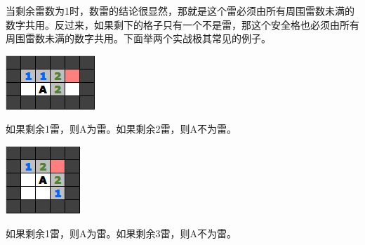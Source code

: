当剩余雷数为1时，数雷的结论很显然，那就是这个雷必须由所有周围雷数未满的数字共用。反过来，如果剩下的格子只有一个不是雷，那这个安全格也必须由所有周围雷数未满的数字共用。下面举两个实战极其常见的例子。

\vspace{5mm}
\begin{center}
    \includegraphics{trick/数雷1.png}
\end{center}
如果剩余1雷，则A为雷。如果剩余2雷，则A不为雷。

\vspace{5mm}
\begin{center}
    \includegraphics{trick/数雷2.png}
\end{center}
如果剩余1雷，则A为雷。如果剩余3雷，则A不为雷。